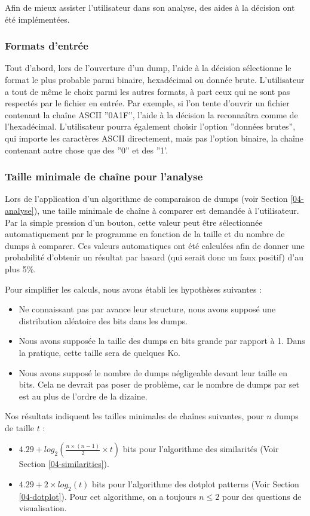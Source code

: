 Afin de mieux assister l'utilisateur dans son analyse, des aides à la décision ont été implémentées.

\subsubsection{Formats d'entrée}

Tout d'abord, lors de l'ouverture d'un dump, l'aide à la décision sélectionne le format le plus probable parmi binaire, hexadécimal ou donnée brute. L'utilisateur a tout de même le choix parmi les autres formats, à part ceux qui ne sont pas respectés par le fichier en entrée.
Par exemple, si l'on tente d'ouvrir un fichier contenant la chaîne ASCII ''0A1F'', l'aide à la décision la reconnaîtra comme de l'hexadécimal. L'utilisateur pourra également choisir l'option ''données brutes'', qui importe les caractères ASCII directement, mais pas l'option binaire, la chaîne contenant autre chose que des ''0'' et des ''1'.

\subsubsection{Taille minimale de chaîne pour l'analyse}

Lors de l'application d'un algorithme de comparaison de dumps (voir Section \ref{04-analyse}), une taille minimale de chaîne à comparer est demandée à l'utilisateur. Par la simple pression d'un bouton, cette valeur peut être sélectionnée automatiquement par le programme en fonction de la taille et du nombre de dumps à comparer.
Ces valeurs automatiques ont été calculées afin de donner une probabilité d'obtenir un résultat par hasard (qui serait donc un faux positif) d'au plus 5\%.

Pour simplifier les calculs, nous avons établi les hypothèses suivantes :
\begin{itemize}
	\item Ne connaissant pas par avance leur structure, nous avons supposé une distribution aléatoire des bits dans les dumps.
	\item Nous avons supposée la taille des dumps en bits grande par rapport à 1. Dans la pratique, cette taille sera de quelques Ko.
	\item Nous avons supposé le nombre de dumps négligeable devant leur taille en bits. Cela ne devrait pas poser de problème, car le nombre de dumps par set est au plus de l'ordre de la dizaine.
\end{itemize}
Nos résultats indiquent les tailles minimales de chaînes suivantes, pour $n$ dumps de taille $t$ :
\begin{itemize}
	\item $4.29+log_{2}\left (\frac{n\times (n-1)}{2}\times t  \right )$ bits pour l'algorithme des similarités (Voir Section \ref{04-similarities}).
	\item $4.29+2\times log_{2}(t)$ bits pour l'algorithme des dotplot patterns (Voir Section \ref{04-dotplot}). Pour cet algorithme, on a toujours $n\leq 2$ pour des questions de visualisation.
\end{itemize}